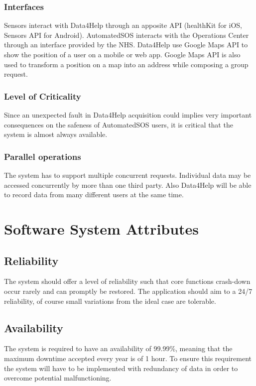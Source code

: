 \subsubsection{Interfaces}
    Sensors interact with Data4Help through an apposite API (healthKit for iOS\cite{healthKit}, Sensors API for Android\cite{sensorsAPI}).
    AutomatedSOS interacts with the Operations Center through an interface provided by the NHS.
    Data4Help use Google Maps API to show the position of a user on a mobile or web app.
    Google Maps API is also used to transform a position on a map into an address while composing a group request.

\subsubsection{Level of Criticality}
Since an unexpected fault in Data4Help acquisition could implies very important consequences on the safeness of AutomatedSOS users, it is critical that the system is almost always available.

\subsubsection {Parallel operations}
The system has to support multiple concurrent requests. Individual data may be accessed concurrently by more than one third party. Also Data4Help will be able to record data from many different users at the same time.

\section{Software System Attributes}
\subsection{Reliability}
The system should offer a level of reliability such that core functions crash-down occur rarely and can promptly be restored.
The application should aim to a 24/7 reliability, of course small variations from the ideal case are tolerable. 

\subsection{Availability}
The system is required to have an availability of 99.99\%, meaning that the maximum downtime accepted every year is of 1 hour. To ensure this requirement the system will have to be implemented with redundancy of data in order to overcome potential malfunctioning.

